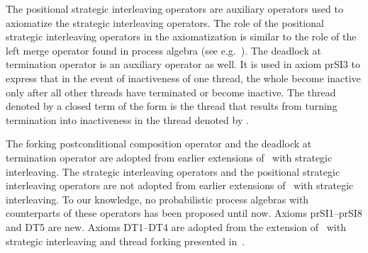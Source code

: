 \documentclass{llncs}
\begin{document}
The positional strategic interleaving operators are auxiliary operators 
used to axiomatize the strategic interleaving operators.
The role of the positional strategic interleaving operators in the 
axiomatization is similar to the role of the left merge operator found 
in process algebra (see e.g.~\cite{BW90}).
The deadlock at termination operator is an auxiliary operator as well.
It is used in axiom prSI3 to express that in the event of inactiveness 
of one thread, the whole become inactive only after all other threads 
have terminated or become inactive.
The thread denoted by a closed term of the form  is the thread
that results from turning termination into inactiveness in the thread
denoted by .

The forking postconditional composition operator and the deadlock at 
termination operator are adopted from earlier extensions of \BTA\ with 
strategic interleaving.
The strategic interleaving operators and the positional strategic 
interleaving operators are not adopted from earlier extensions of \BTA\ 
with strategic interleaving.
To our knowledge, no probabilistic process algebras with counterparts of 
these operators has been proposed until now. 
Axioms prSI1--prSI8 and DT5 are new.
Axioms DT1--DT4 are adopted from the extension of \BTA\ with strategic
interleaving and thread forking presented in~\cite{BM06c}.
\end{document}

